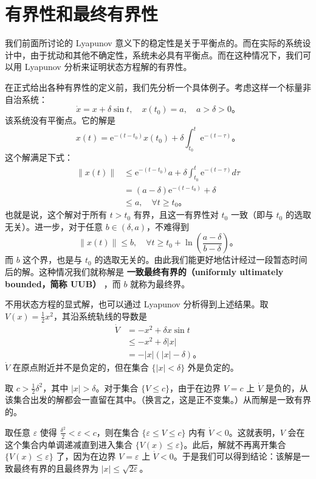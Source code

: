 \section{有界性和最终有界性}\label{3Fref}

我们前面所讨论的 Lyapunov 意义下的稳定性是关于平衡点的。而在实际的系统设计中，由于扰动和其他不确定性，系统未必具有平衡点。而在这种情况下，我们可以用 Lyapunov 分析来证明状态方程解的有界性。

在正式给出各种有界性的定义前，我们先分析一个具体例子。考虑这样一个标量非自治系统：
\[
    \dot{x} = x + \delta \sin{t}, \quad x(t_0) = a, \quad a > \delta > 0 \text{。}
\]
该系统没有平衡点。它的解是
\[
    x (t) = \mathrm{e}^{- (t - t_0)} x (t_0) + \delta \int^t_{t_0} \mathrm{e}^{- (t - \tau)} \text{。}
\]
这个解满足下式：
\begin{align*}
    \| x (t) \| & \leq  \mathrm{e}^{- (t - t_0)} a + \delta \int^t_{t_0} \mathrm{e}^{- (t - \tau)} d  \tau \\
    & =  (a - \delta) \mathrm{e}^{- (t - t_0)} + \delta \\
    & \leq  a, \quad \forall t \geq t_0 \text{。}
\end{align*}
也就是说，这个解对于所有 $t > t_0$ 有界，且这一有界性对 $t_0$ 一致（即与 $t_0$ 的选取无关）。进一步，对于任意 $b \in (\delta, a)$，不难得到
\[
    \| x (t) \| \leq b, \quad \forall t \geq t_0 + \ln \left( \frac{a - \delta}{b - \delta} \right) \text{。}
\]
而 $b$ 这个界，也是与 $t_0$ 的选取无关的。由此我们能更好地估计经过一段暂态时间后的解。这种情况我们就称解是 \textbf{一致最终有界的（uniformly ultimately bounded，简称 UUB）} ，而 $b$ 就称为最终界。

不用状态方程的显式解，也可以通过 Lyapunov 分析得到上述结果。取 $V (x) = \frac{1}{2} x^2$，其沿系统轨线的导数是
\begin{align*}
  \dot{V} & =  - x^2 + \delta x  \sin  t\\
  & \leq  - x^2 + \delta | x  |\\
  & =  - | x | (| x | - \delta) \text{。}
\end{align*}
$\dot{V}$ 在原点附近并不是负定的，但在集合 $\{ | x | < \delta \}$ 外是负定的。

取 $c > \frac{1}{2} \delta^2$，其中 $| x | > \delta$。对于集合 $\{ V \leq c \}$，由于在边界 $V = c$ 上 $\dot{V}$ 是负的，从该集合出发的解都会一直留在其中。（换言之，这是正不变集。）从而解是一致有界的。

取任意 $\varepsilon$ 使得 $\frac{\delta^2}{2} < \varepsilon < c$，则在集合 $\{ \varepsilon \leq V \leq c \}$ 内有  $\dot{V} < 0$。这就表明，$V$ 会在这个集合内单调递减直到进入集合 $\{ V (x) \leq \varepsilon \}$。此后，解就不再离开集合 $\{ V (x) \leq \varepsilon \}$ 了，因为在边界 $V = \varepsilon$ 上 $\dot{V} < 0$。于是我们可以得到结论：该解是一致最终有界的且最终界为 $| x | \leq \sqrt{2 \varepsilon}$。


